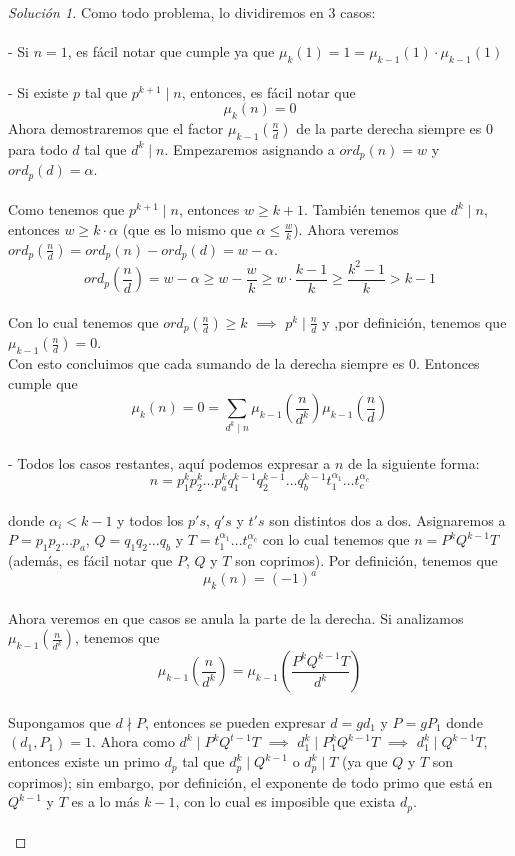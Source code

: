 \documentclass{article}
\theoremstyle{definition}
\theoremstyle{remark}
\begin{document}
\begin{proof}[Soluci\'on 1]
Como todo problema, lo dividiremos en $3$ casos: \\ \\
- Si $n = 1$, es f\'acil notar que cumple ya que $\mu_k(1) = 1 = \mu_{k - 1}(1)\cdot \mu_{k - 1}(1)$ \\ \\
- Si existe $p$ tal que $p^{k + 1} \mid n$, entonces, es f\'acil notar que 
$$\mu_k(n) = 0$$
Ahora demostraremos que el factor $\mu_{k - 1}\left ( \frac{n}{d} \right )$ de la parte derecha siempre es $0$ para todo $d$ tal que $d^k \mid n$. Empezaremos asignando a $ord_p(n) = w$ y $ord_p(d) = \alpha$.\\ \\ 
Como tenemos que $p^{k + 1} \mid n$, entonces $w \geq k + 1$. Tambi\'en tenemos que $d^{k} \mid n$, entonces $w \geq k\cdot \alpha$ (que es lo mismo que $\alpha \leq \frac{w}{k}$). Ahora veremos $ord_p(\frac{n}{d}) = ord_p(n) - ord_p(d) = w - \alpha$.
$$ord_p(\frac{n}{d}) = w - \alpha \geq w - \frac{w}{k} \geq w\cdot \frac{k - 1}{k} \geq \frac{k^2 - 1}{k} > k - 1$$ \\
Con lo cual tenemos que $ord_p(\frac{n}{d}) \geq k$ $\implies$ $p^k \mid \frac{n}{d}$ y ,por definici\'on, tenemos que $\mu_{k - 1}(\frac{n}{d}) = 0$. \\
Con esto concluimos que cada sumando de la derecha siempre es $0$. Entonces cumple que 
$$\mu_k(n) = 0 = \sum_{d^k \mid n}\mu_{k - 1}\left (\frac{n}{d^k}\right )\mu_{k - 1}\left (\frac{n}{d} \right )$$ \\ 
- Todos los casos restantes, aqu\'i podemos expresar a $n$ de la siguiente forma:
$$n = p_1^{k}p_2^{k}\dots p_a^{k}q_1^{k - 1}q_2^{k - 1}\dots q_b^{k - 1}t_1^{\alpha_1}\dots t_c^{\alpha_c}$$ \\
donde $\alpha_i < k - 1$ y todos los $p's$, $q's$ y $t's$ son distintos dos a dos. Asignaremos a $P = p_1p_2\dots p_a$, $Q = q_1q_2\dots q_b$ y $T = t_1^{\alpha_1}\dots t_c^{\alpha_c}$ con lo cual tenemos que $n = P^kQ^{k - 1}T$ (adem\'as, es f\'acil notar que $P$, $Q$ y $T$ son coprimos). Por definici\'on, tenemos que
$$\mu_k(n) = (-1)^{a}$$ \\
Ahora veremos en que casos se anula la parte de la derecha. Si analizamos $\mu_{k - 1}\left (\frac{n}{d^k}\right )$, tenemos que
$$\mu_{k - 1}\left (\frac{n}{d^k}\right ) = \mu_{k - 1}\left (\frac{P^kQ^{k - 1}T}{d^k}\right )$$ \\
Supongamos que $d \nmid P$, entonces se pueden expresar $d = gd_1$ y $P = gP_1$ donde $(d_1, P_1) = 1$. Ahora como $d^{k} \mid P^{k}Q^{t - 1}T$ $\implies$ $d_1^k \mid P_1^kQ^{k - 1}T$ $\implies$ $d_1^k \mid Q^{k - 1}T$, entonces existe un primo $d_p$ tal que $d_p^k \mid Q^{k - 1}$ o $d_p^k \mid T$ (ya que $Q$ y $T$ son coprimos); sin embargo, por definici\'on, el exponente de todo primo que est\'a en $Q^{k - 1}$ y $T$ es a lo m\'as $k - 1$, con lo cual es imposible que exista $d_p$. \\ \\

\end{proof}
\end{document}
